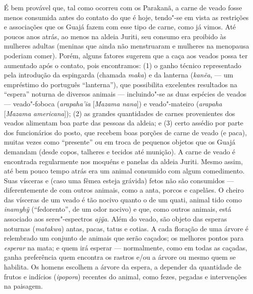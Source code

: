 É bem provável que, tal como ocorreu com os Parakanã, a carne de veado
fosse menos consumida antes do contato do que é hoje, tendo"-se em vista
as restrições e associações que os Guajá fazem com esse tipo de carne,
como já vimos. Até poucos anos atrás, ao menos na aldeia Juriti, seu
consumo era proibido às mulheres adultas (meninas que ainda não
menstruaram e mulheres na menopausa poderiam comer). Porém, alguns
fatores sugerem que a caça aos veados possa ter aumentado após o
contato, pois encontramos: (1) o ganho técnico representado pela
introdução da espingarda (chamada \emph{maka}) e da lanterna
(\emph{kanẽa}, --- um empréstimo do português ``lanterna''), que possibilita
excelentes resultados na ``espera'' noturna de diversos animais ---
incluindo"-se as duas espécies de veados --- veado"-foboca
(\emph{arapaha'ia} {[}\emph{Mazama nana}{]}) e veado"-mateiro
(\emph{arapaha} {[}\emph{Mazama americana}{]}); (2) as grandes
quantidades de carnes provenientes dos veados alimentam boa parte das
pessoas da aldeia; e (3) certo assédio por parte dos funcionários do
posto, que recebem boas porções de carne de veado (e paca), muitas vezes
como ``presente'' ou em troca de pequenos objetos que os Guajá demandam
(desde copos, talheres e tecidos até munição). A carne de veado é
encontrada regularmente nos moquéns e panelas da aldeia Juriti. Mesmo
assim, até bem pouco tempo atrás era um animal consumido com algum
comedimento. Suas vísceras e (caso uma fêmea esteja grávida) fetos não
são consumidos --- diferentemente de com outros animais, como a anta,
porcos e capelães. O cheiro das vísceras de um veado é tão nocivo quanto
o de um quati, animal tido como \emph{inamyhỹ} (``fedorento'', de um odor
nocivo) e que, como outros animais, está associado aos seres"-espectros
\emph{ajỹa}. Além do veado, são objeto das esperas noturnas
(\emph{matakwa}) antas, pacas, tatus e cotias. A cada floração de uma
árvore é relembrado um conjunto de animais que serão caçados; os
melhores pontos para \emph{esperar} na mata; e quem irá esperar ---
normalmente, como em todas as caçadas, ganha preferência quem encontra
os rastros e/ou a árvore ou mesmo quem se habilita. Os homens escolhem a
árvore da espera, a depender da quantidade de frutos e indícios
(\emph{ipopora}) recentes do animal, como fezes, pegadas e intervenções
na paisagem.

